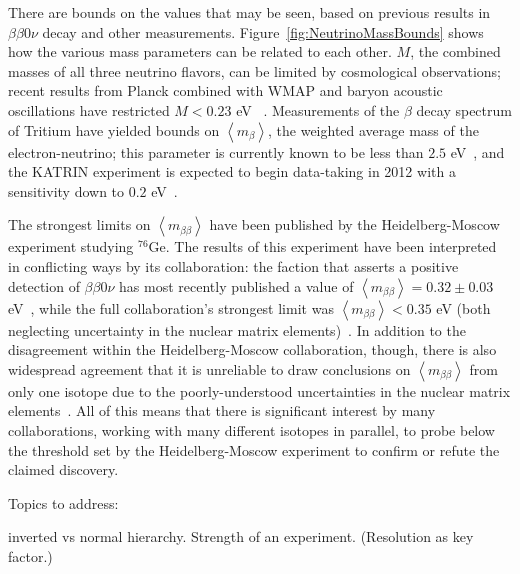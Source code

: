 There are bounds on the values that may be seen, based on previous results in $\beta\beta 0\nu$ decay and other measurements.  Figure~\ref{fig:NeutrinoMassBounds} shows how the various mass parameters can be related to each other.  $M$, the combined masses of all three neutrino flavors, can be limited by cosmological observations; recent results from Planck combined with WMAP and baryon acoustic oscillations have restricted $M < 0.23$ eV ~\cite{CosmologicalLimits}.  Measurements of the $\beta$ decay spectrum of Tritium have yielded bounds on $\left< m_\beta \right>$, the weighted average mass of the electron-neutrino; this parameter is currently known to be less than $2.5$ eV~\cite{OldTritium}, and the KATRIN experiment is expected to begin data-taking in 2012 with a sensitivity down to $0.2$ eV~\cite{NewTritium}.

The strongest limits on $\left< m_{\beta\beta} \right>$ have been published by the Heidelberg-Moscow experiment studying $^{76}$Ge.  The results of this experiment have been interpreted in conflicting ways by its collaboration:  the faction that asserts a positive detection of $\beta\beta 0\nu$ has most recently published a value of $\left< m_{\beta\beta} \right> = 0.32 \pm 0.03$ eV~\cite{Klapdor}, while the full collaboration's strongest limit was $\left< m_{\beta\beta} \right> < 0.35$ eV (both neglecting uncertainty in the nuclear matrix elements)~\cite{KlapdorDissent}.  In addition to the disagreement within the Heidelberg-Moscow collaboration, though, there is also widespread agreement that it is unreliable to draw conclusions on $\left< m_{\beta\beta} \right>$ from only one isotope due to the poorly-understood uncertainties in the nuclear matrix elements~\cite{RMPbb0n}.  All of this means that there is significant interest by many collaborations, working with many different isotopes in parallel, to probe below the threshold set by the Heidelberg-Moscow experiment to confirm or refute the claimed discovery.

Topics to address:

inverted vs normal hierarchy.
Strength of an experiment.  (Resolution as key factor.)
